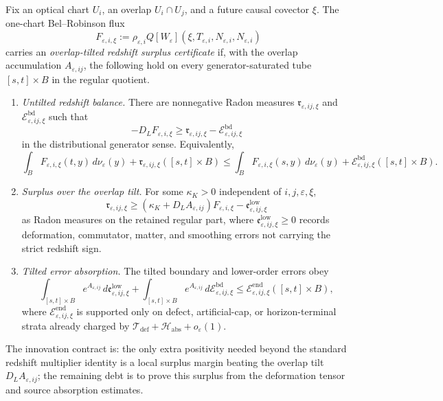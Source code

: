 \begin{definition}\label{def:OverlapTiltedRedshiftSurplusCertificate}
Fix an optical chart $U_i$, an overlap $U_i\cap U_j$, and a future causal covector $\xi$.  The one-chart Bel--Robinson flux
\[
    F_{\varepsilon,i,\xi}
    :=
    \rho_{\varepsilon,i}
    Q[W_\varepsilon](\xi,T_{\varepsilon,i},N_{\varepsilon,i},N_{\varepsilon,i})
\]
carries an \emph{overlap-tilted redshift surplus certificate} if, with the overlap accumulation $A_{\varepsilon,ij}$, the following hold on every generator-saturated tube $[s,t]\times B$ in the regular quotient.
\begin{enumerate}
    \item \emph{Untilted redshift balance.}  There are nonnegative Radon measures
    $\mathfrak r_{\varepsilon,ij,\xi}$ and
    $\mathcal E^{\mathrm{bd}}_{\varepsilon,ij,\xi}$ such that
    \[
        -D_LF_{\varepsilon,i,\xi}
        \ge
        \mathfrak r_{\varepsilon,ij,\xi}
        -
        \mathcal E^{\mathrm{bd}}_{\varepsilon,ij,\xi}
    \]
    in the distributional generator sense.  Equivalently,
    \[
        \int_B F_{\varepsilon,i,\xi}(t,y)\,d\nu_\varepsilon(y)
        +
        \mathfrak r_{\varepsilon,ij,\xi}([s,t]\times B)
        \le
        \int_B F_{\varepsilon,i,\xi}(s,y)\,d\nu_\varepsilon(y)
        +
        \mathcal E^{\mathrm{bd}}_{\varepsilon,ij,\xi}([s,t]\times B).
    \]
    \item \emph{Surplus over the overlap tilt.}  For some $\kappa_K>0$ independent of $i,j,\varepsilon,\xi$,
    \[
        \mathfrak r_{\varepsilon,ij,\xi}
        \ge
        \left(\kappa_K+D_LA_{\varepsilon,ij}\right)
        F_{\varepsilon,i,\xi}
        -
        \mathfrak e^{\mathrm{low}}_{\varepsilon,ij,\xi}
    \]
    as Radon measures on the retained regular part, where $\mathfrak e^{\mathrm{low}}_{\varepsilon,ij,\xi}\ge0$ records deformation, commutator, matter, and smoothing errors not carrying the strict redshift sign.
    \item \emph{Tilted error absorption.}  The tilted boundary and lower-order errors obey
    \[
        \int_{[s,t]\times B}e^{A_{\varepsilon,ij}}\,
        d\mathfrak e^{\mathrm{low}}_{\varepsilon,ij,\xi}
        +
        \int_{[s,t]\times B}e^{A_{\varepsilon,ij}}\,
        d\mathcal E^{\mathrm{bd}}_{\varepsilon,ij,\xi}
        \le
        \mathcal E^{\mathrm{end}}_{\varepsilon,ij,\xi}([s,t]\times B),
    \]
    where $\mathcal E^{\mathrm{end}}_{\varepsilon,ij,\xi}$ is supported only on defect, artificial-cap, or horizon-terminal strata already charged by
    $\mathcal T_{\mathrm{def}}+\mathcal H_{\mathrm{abs}}+o_\varepsilon(1)$.
\end{enumerate}
The innovation contract is: the only extra positivity needed beyond the standard redshift multiplier identity is a local surplus margin beating the overlap tilt $D_LA_{\varepsilon,ij}$; the remaining debt is to prove this surplus from the deformation tensor and source absorption estimates.
\end{definition}

